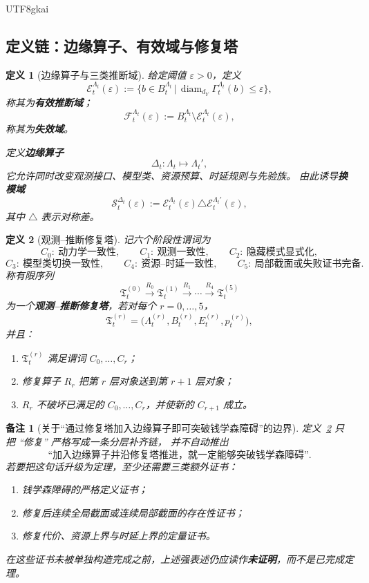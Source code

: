 \documentclass[12pt]{article}
\newtheorem{definition}{定义}[section]
\newtheorem{remark}{备注}[section]
\newcommand{\diameter}{\operatorname{diam}}
\begin{document}
\begin{CJK*}{UTF8}{gkai}
\subsection{定义链：边缘算子、有效域与修复塔}
\label{subsec:tex1-ch1-defs-edge}

\begin{definition}[边缘算子与三类推断域]
\label{def:tex1-edge-operator}
给定阈值 $\varepsilon>0$，定义
\[
  \mathcal E_t^{\Lambda_t}(\varepsilon)
  :=
  \bigl\{
    b\in B_t^{\Lambda_t}
    \,\big|\,
    \diameter_{d_Y}\Gamma_t^{\Lambda_t}(b)\le \varepsilon
  \bigr\},
\]
称其为\textbf{有效推断域}；
\[
  \mathcal F_t^{\Lambda_t}(\varepsilon)
  :=
  B_t^{\Lambda_t}\setminus \mathcal E_t^{\Lambda_t}(\varepsilon),
\]
称其为\textbf{失效域}。

定义\textbf{边缘算子}
\[
  \Delta_t:\Lambda_t\mapsto \Lambda_t',
\]
它允许同时改变观测接口、模型类、资源预算、时延规则与先验族。
由此诱导\textbf{换模域}
\[
  \mathcal S_t^{\Delta_t}(\varepsilon)
  :=
  \mathcal E_t^{\Lambda_t}(\varepsilon)
  \triangle
  \mathcal E_t^{\Lambda_t'}(\varepsilon),
\]
其中 $\triangle$ 表示对称差。
\end{definition}

\begin{definition}[观测--推断修复塔]
\label{def:tex1-repair-tower}
记六个阶段性谓词为
\[
  C_0:\ \text{动力学一致性},
  \qquad
  C_1:\ \text{观测一致性},
  \qquad
  C_2:\ \text{隐藏模式显式化},
\]
\[
  C_3:\ \text{模型类切换一致性},
  \qquad
  C_4:\ \text{资源--时延一致性},
  \qquad
  C_5:\ \text{局部截面或失败证书完备}.
\]
称有限序列
\[
  \mathfrak T_t^{(0)}
  \xrightarrow{R_0}
  \mathfrak T_t^{(1)}
  \xrightarrow{R_1}
  \cdots
  \xrightarrow{R_4}
  \mathfrak T_t^{(5)}
\]
为一个\textbf{观测--推断修复塔}，若对每个 $r=0,\dots,5$，
\[
  \mathfrak T_t^{(r)}
  =
  \bigl(
    \Lambda_t^{(r)},
    B_t^{(r)},
    E_t^{(r)},
    p_t^{(r)}
  \bigr),
\]
并且：
\begin{enumerate}
  \item $\mathfrak T_t^{(r)}$ 满足谓词 $C_0,\dots,C_r$；
  \item 修复算子 $R_r$ 把第 $r$ 层对象送到第 $r+1$ 层对象；
  \item $R_r$ 不破坏已满足的 $C_0,\dots,C_r$，并使新的 $C_{r+1}$ 成立。
\end{enumerate}
\end{definition}

\begin{remark}[关于“通过修复塔加入边缘算子即可突破钱学森障碍”的边界]
定义~\ref{def:tex1-repair-tower} 只把 ``修复'' 严格写成一条分层补齐链，
并不自动推出
\[
  \text{“加入边缘算子并沿修复塔推进，就一定能够突破钱学森障碍”}.
\]
若要把这句话升级为定理，至少还需要三类额外证书：
\begin{enumerate}
  \item 钱学森障碍的严格定义证书；
  \item 修复后连续全局截面或连续局部截面的存在性证书；
  \item 修复代价、资源上界与时延上界的定量证书。
\end{enumerate}
在这些证书未被单独构造完成之前，上述强表述仍应读作\textbf{未证明}，而不是已完成定理。
\end{remark}


\end{CJK*}
\end{document}

